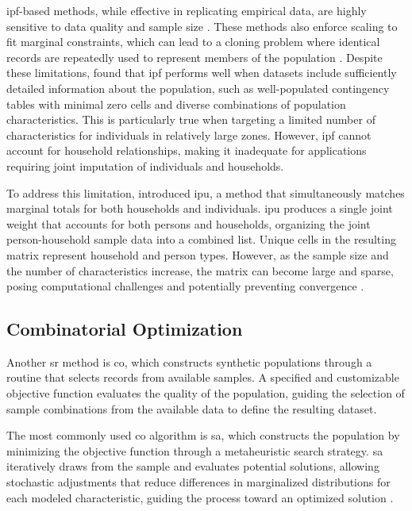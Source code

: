 ﻿\documentclass[../main.tex]{subfiles}
\begin{document}
\gls{ipf}-based methods, while effective in replicating empirical data, are highly sensitive to data quality and sample size \citep{Gargiulo2010AnHouseholds}. These methods also enforce scaling to fit marginal constraints, which can lead to a cloning problem where identical records are repeatedly used to represent members of the population \citep{Whitworth2022SynthACS:Data}. Despite these limitations, \citet{Albiston2024ASynthesis} found that \gls{ipf} performs well when datasets include sufficiently detailed information about the population, such as well-populated contingency tables with minimal zero cells and diverse combinations of population characteristics. This is particularly true when targeting a limited number of characteristics for individuals in relatively large zones. However, \gls{ipf} cannot account for household relationships, making it inadequate for applications requiring joint imputation of individuals and households.

To address this limitation, \citet{Ye2009MethodologyPopulations} introduced \gls{ipu}, a method that simultaneously matches marginal totals for both households and individuals. \gls{ipu} produces a single joint weight that accounts for both persons and households, organizing the joint person-household sample data into a combined list. Unique cells in the resulting matrix represent household and person types. However, as the sample size and the number of characteristics increase, the matrix can become large and sparse, posing computational challenges and potentially preventing convergence \citep{Templ2017SimulationSimPop}.

\subsection{Combinatorial Optimization}
Another \gls{sr} method is \gls{co}, which constructs synthetic populations through a routine that selects records from available samples. A specified and customizable objective function evaluates the quality of the population, guiding the selection of sample combinations from the available data to define the resulting dataset.

The most commonly used \gls{co} algorithm is \gls{sa}, which constructs the population by minimizing the objective function through a metaheuristic search strategy. \gls{sa} iteratively draws from the sample and evaluates potential solutions, allowing stochastic adjustments that reduce differences in marginalized distributions for each modeled characteristic, guiding the process toward an optimized solution \citep{Abraham2012PopulationLevels, Whitworth2022SynthACS:Data, Kim2016AModel, Duran-Heras2018ComparisonMethod}.
\end{document}
